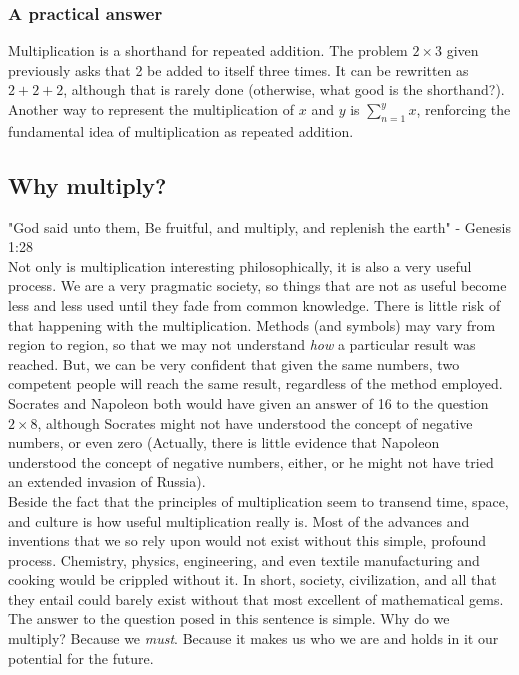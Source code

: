 \documentclass{article}
\begin{document}
\subsubsection{A practical answer}
Multiplication is a shorthand for repeated addition. The problem $2 \times 3$ given previously asks that 2 be added to itself three times. It can be rewritten as $2 + 2 + 2$, although that is rarely done (otherwise, what good is the shorthand?). Another way to represent the multiplication of $x$ and $y$ is $\sum^y_{n=1} x$, renforcing the fundamental idea of multiplication as repeated addition.\\

\subsection{Why multiply?}
"God said unto them, Be fruitful, and multiply, and replenish the earth" - Genesis 1:28\\
Not only is multiplication interesting philosophically, it is also a very useful process. We are a very pragmatic society, so things that are not as useful become less and less used until they fade from common knowledge. There is little risk of that happening with the multiplication. Methods (and symbols) may vary from region to region, so that we may not understand \emph{how} a particular result was reached. But, we can be very confident that given the same numbers, two competent people will reach the same result, regardless of the method employed. Socrates and Napoleon both would have given an answer of 16 to the question $2 \times 8$, although Socrates might not have understood the concept of negative numbers, or even zero (Actually, there is little evidence that Napoleon understood the concept of negative numbers, either, or he might not have tried an extended invasion of Russia).\\
Beside the fact that the principles of multiplication seem to transend time, space, and culture is how useful multiplication really is. Most of the advances and inventions that we so rely upon would not exist without this simple, profound process. Chemistry, physics, engineering, and even textile manufacturing and cooking would be crippled without it. In short, society, civilization, and all that they entail could barely exist without that most excellent of mathematical gems.\\
The answer to the question posed in this sentence is simple. Why do we multiply? Because we \emph{must}. Because it makes us who we are and holds in it our potential for the future.
\end{document}

